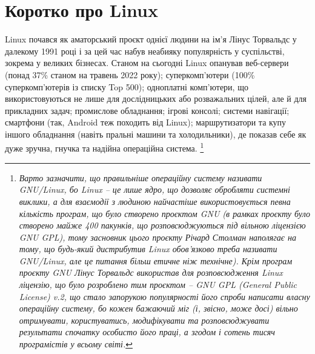 \documentclass[10pt,a4paper]{fancyhandout}
\begin{document}
\section{Коротко про Linux}
Linux почався як аматорський проєкт однієї людини на ім'я Лінус Торвальдс у далекому 1991 році і за цей час набув неабияку популярність у суспільстві, зокрема у великих бізнесах. Станом на сьогодні Linux опанував веб-сервери (понад 37\% станом на травень 2022 року); суперкомп'ютери (100\% суперкомп'ютерів із списку Top 500); одноплатні комп'ютери, що використовуються не лише для дослідницьких або розважальних цілей, але й для прикладних задач; промислове обладнання; ігрові консолі; системи навігації; смартфони (так, Android теж походить від Linux); маршрутизатори та купу іншого обладнання (навіть пральні машини та холодильники), де показав себе як дуже зручна, гнучка та надійна операційна система.
\footnote{\textit{Варто зазначити, що правильніше операційну систему називати GNU/Linux, бо Linux -- це лише ядро, що дозволяє обробляти системні виклики, а для взаємодії з людиною найчастіше використовується певна кількість програм, що було створено проєктом GNU (в рамках проєкту було створено майже 400 пакунків, що розповсюджуються під вільною ліцензією GNU GPL), тому засновник цього проєкту Річард Столман наполягає на тому, що будь-який дистрибутив Linux обов'язково треба називати GNU/Linux, але це питання більш етичне ніж технічне). Крім програм проєкту GNU Лінус Торвальдс використав для розповсюдження Linux ліцензію, що було розроблено тим проєктом -- GNU GPL (General Public License) v.2, що стало запорукою популярності його спроби написати власну операційну систему, бо кожен бажаючий міг (і, звісно, може досі) вільно отримувати, користуватись, модифікувати та розповсюджувати результати спочатку особисто його праці, а згодом і сотень тисяч програмістів у всьому світі.}}
\goodbreak
\end{document}
